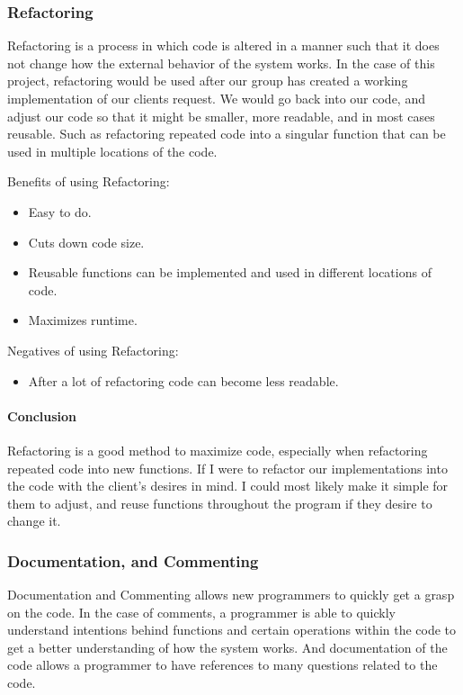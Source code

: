\documentclass[10pt,journal,compsoc,draftclsnofoot]{IEEEtran}
\begin{document}
\subsubsection{Refactoring}
Refactoring is a process in which code is altered in a manner such that it does not change how the external behavior of the system works.\cite{refactoring}
In the case of this project, refactoring would be used after our group has created a working implementation of our clients request.
We would go back into our code, and adjust our code so that it might be smaller, more readable, and in most cases reusable.
Such as refactoring repeated code into a singular function that can be used in multiple locations of the code.

Benefits of using Refactoring:
\begin{itemize}
\item Easy to do.
\item Cuts down code size.
\item Reusable functions can be implemented and used in different locations of code.
\item Maximizes runtime.
\end{itemize}

Negatives of using Refactoring:
\begin{itemize}
\item After a lot of refactoring code can become less readable.
\end{itemize}

\paragraph{Conclusion}
\vspace{3mm}
Refactoring is a good method to maximize code, especially when refactoring repeated code into new functions.
If I were to refactor our implementations into the code with the client's desires in mind.
I could most likely make it simple for them to adjust, and reuse functions throughout the program if they desire to change it.

\subsubsection{Documentation, and Commenting}
Documentation and Commenting allows new programmers to quickly get a grasp on the code.
In the case of comments, a programmer is able to quickly understand intentions behind functions and certain operations within the code to get a better understanding of how the system works.
And documentation of the code allows a programmer to have references to many questions related to the code.
\end{document}
